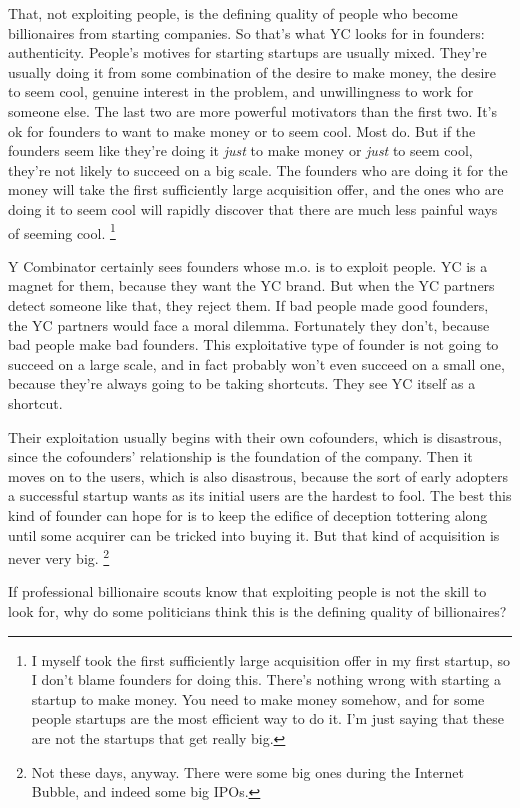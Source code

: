 That, not exploiting people, is the defining quality of people who
become billionaires from starting companies. So that's what YC looks for
in founders: authenticity. People's motives for starting startups are
usually mixed. They're usually doing it from some combination of the
desire to make money, the desire to seem cool, genuine interest in the
problem, and unwillingness to work for someone else. The last two are
more powerful motivators than the first two. It's ok for founders to
want to make money or to seem cool. Most do. But if the founders seem
like they're doing it \emph{just} to make money or \emph{just} to seem
cool, they're not likely to succeed on a big scale. The founders who are
doing it for the money will take the first sufficiently large
acquisition offer, and the ones who are doing it to seem cool will
rapidly discover that there are much less painful ways of seeming cool.
\footnote{I myself took the first sufficiently large acquisition offer in
my first startup, so I don't blame founders for doing this. There's
nothing wrong with starting a startup to make money. You need to make
money somehow, and for some people startups are the most efficient way
to do it. I'm just saying that these are not the startups that get
really big.}

Y Combinator certainly sees founders whose m.o. is to exploit people. YC
is a magnet for them, because they want the YC brand. But when the YC
partners detect someone like that, they reject them. If bad people made
good founders, the YC partners would face a moral dilemma. Fortunately
they don't, because bad people make bad founders. This exploitative type
of founder is not going to succeed on a large scale, and in fact
probably won't even succeed on a small one, because they're always going
to be taking shortcuts. They see YC itself as a shortcut.

Their exploitation usually begins with their own cofounders, which is
disastrous, since the cofounders' relationship is the foundation of the
company. Then it moves on to the users, which is also disastrous,
because the sort of early adopters a successful startup wants as its
initial users are the hardest to fool. The best this kind of founder can
hope for is to keep the edifice of deception tottering along until some
acquirer can be tricked into buying it. But that kind of acquisition is
never very big. \footnote{Not these days, anyway. There were some big ones during the
Internet Bubble, and indeed some big IPOs.}

If professional billionaire scouts know that exploiting people is not
the skill to look for, why do some politicians think this is the
defining quality of billionaires?

